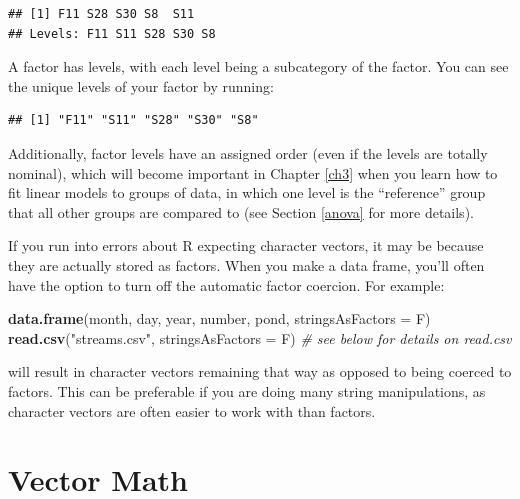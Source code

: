 \documentclass[]{book}
\newenvironment{Shaded}{\begin{snugshade}}{\end{snugshade}}
\newcommand{\CommentTok}[1]{\textcolor[rgb]{0.56,0.35,0.01}{\textit{#1}}}
\newcommand{\DataTypeTok}[1]{\textcolor[rgb]{0.13,0.29,0.53}{#1}}
\newcommand{\KeywordTok}[1]{\textcolor[rgb]{0.13,0.29,0.53}{\textbf{#1}}}
\newcommand{\NormalTok}[1]{#1}
\newcommand{\OperatorTok}[1]{\textcolor[rgb]{0.81,0.36,0.00}{\textbf{#1}}}
\newcommand{\StringTok}[1]{\textcolor[rgb]{0.31,0.60,0.02}{#1}}
\begin{document}
\begin{verbatim}
## [1] F11 S28 S30 S8  S11
## Levels: F11 S11 S28 S30 S8
\end{verbatim}

A factor has levels, with each level being a subcategory of the factor. You can see the unique levels of your factor by running:

\begin{Shaded}
\end{Shaded}

\begin{verbatim}
## [1] "F11" "S11" "S28" "S30" "S8"
\end{verbatim}

Additionally, factor levels have an assigned order (even if the levels are totally nominal), which will become important in Chapter \ref{ch3} when you learn how to fit linear models to groups of data, in which one level is the ``reference'' group that all other groups are compared to (see Section \ref{anova} for more details).

If you run into errors about R expecting character vectors, it may be because they are actually stored as factors. When you make a data frame, you'll often have the option to turn off the automatic factor coercion. For example:

\begin{Shaded}
\begin{Highlighting}[]
\KeywordTok{data.frame}\NormalTok{(month, day, year, number, pond, }\DataTypeTok{stringsAsFactors =}\NormalTok{ F)}
\KeywordTok{read.csv}\NormalTok{(}\StringTok{"streams.csv"}\NormalTok{, }\DataTypeTok{stringsAsFactors =}\NormalTok{ F)  }\CommentTok{# see below for details on read.csv}
\end{Highlighting}
\end{Shaded}

will result in character vectors remaining that way as opposed to being coerced to factors. This can be preferable if you are doing many string manipulations, as character vectors are often easier to work with than factors.

\hypertarget{vector-math}{%
\section{Vector Math}\label{vector-math}}
\end{document}
